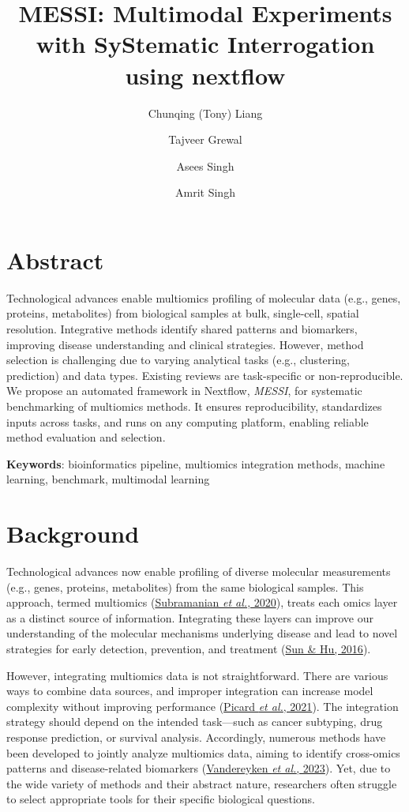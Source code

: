 \documentclass[
]{article}
\title{MESSI: Multimodal Experiments with SyStematic Interrogation using nextflow}
\author{Chunqing (Tony) Liang \and Tajveer Grewal \and Asees Singh \and Amrit Singh}
\date{}
\begin{document}
\maketitle

\hypertarget{abstract}{%
\section{Abstract}\label{abstract}}

Technological advances enable multiomics profiling of molecular data (e.g., genes, proteins, metabolites) from biological samples at bulk, single-cell, spatial resolution. Integrative methods identify shared patterns and biomarkers, improving disease understanding and clinical strategies. However, method selection is challenging due to varying analytical tasks (e.g., clustering, prediction) and data types. Existing reviews are task-specific or non-reproducible. We propose an automated framework in Nextflow, \emph{MESSI}, for systematic benchmarking of multiomics methods. It ensures reproducibility, standardizes inputs across tasks, and runs on any computing platform, enabling reliable method evaluation and selection.

\textbf{Keywords}: bioinformatics pipeline, multiomics integration methods, machine learning, benchmark, multimodal learning

\hypertarget{background}{%
\section{Background}\label{background}}

Technological advances now enable profiling of diverse molecular measurements (e.g., genes, proteins, metabolites) from the same biological samples. This approach, termed multiomics (\protect\hyperlink{ref-subramanian2020multi}{Subramanian \emph{et al.}, 2020}), treats each omics layer as a distinct source of information. Integrating these layers can improve our understanding of the molecular mechanisms underlying disease and lead to novel strategies for early detection, prevention, and treatment (\protect\hyperlink{ref-sun2016integrative}{Sun \& Hu, 2016}).

However, integrating multiomics data is not straightforward. There are various ways to combine data sources, and improper integration can increase model complexity without improving performance (\protect\hyperlink{ref-picard2021integration}{Picard \emph{et al.}, 2021}). The integration strategy should depend on the intended task---such as cancer subtyping, drug response prediction, or survival analysis. Accordingly, numerous methods have been developed to jointly analyze multiomics data, aiming to identify cross-omics patterns and disease-related biomarkers (\protect\hyperlink{ref-vandereyken2023methods}{Vandereyken \emph{et al.}, 2023}). Yet, due to the wide variety of methods and their abstract nature, researchers often struggle to select appropriate tools for their specific biological questions.
\end{document}

